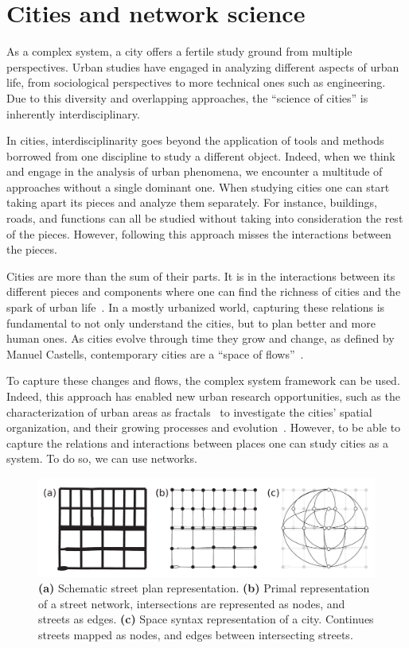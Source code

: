 \section{Cities and network science}


As a complex system, a city offers a fertile study ground from multiple perspectives. Urban studies have engaged in analyzing different aspects of urban life, from sociological perspectives to more technical ones such as engineering. Due to this diversity and overlapping approaches, the ``science of cities'' is inherently interdisciplinary.

In cities, interdisciplinarity goes beyond the application of tools and methods borrowed from one discipline to study a different object. Indeed, when we think and engage in the analysis of urban phenomena, we encounter a multitude of approaches without a single dominant one. When studying cities one can start taking apart its pieces and analyze them separately. For instance, buildings, roads, and functions can all be studied without taking into consideration the rest of the pieces. However, following this approach misses the interactions between the pieces. 

Cities are more than the sum of their parts. It is in the interactions between its different pieces and components where one can find the richness of cities and the spark of urban life~\cite{Jacobs1961Death}. In a mostly urbanized world, capturing these relations is fundamental to not only understand the cities, but to plan better and more human ones. As cities evolve through time they grow and change, as defined by Manuel Castells, contemporary cities are a ``space of flows''~\cite{castells1989informational}. 

To capture these changes and flows, the complex system framework can be used. Indeed, this approach has enabled new urban research opportunities, such as the characterization of urban areas as fractals~\cite{batty1996preliminary} to investigate the cities' spatial organization, and their growing processes and evolution~\cite{makse1995growth}. However, to be able to capture the relations and interactions between places one can study cities as a system. To do so, we can use networks.

\begin{figure}[th!]
	\centering
	\includegraphics[width=\textwidth]{images/introduction/networks.pdf}
	\caption[Network representation of a city]{\textbf{(a)} Schematic street plan representation. \textbf{(b)} Primal representation of a street network, intersections are represented as nodes, and streets as edges. \textbf{(c)} Space syntax representation of a city. Continues streets mapped as nodes, and edges between intersecting streets.}
	\label{fig:networks}
\end{figure}


